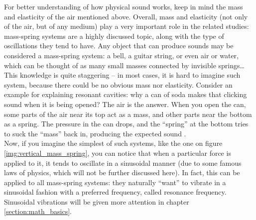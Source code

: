 For better understanding of how physical sound works, keep in mind the mass and elasticity of the air mentioned above. Overall, mass and elasticity (not only of the air, but of any medium) play a very important role in the related studies: mass-spring systems are a highly discussed topic, along with the type of oscillations they tend to have. Any object that can produce sounds may be considered a mass-spring system: a bell, a guitar string, or even air or water, which can be thought of as many small masses connected by invisible springs\dots{} This knowledge is quite staggering -- in most cases, it is hard to imagine such system, because there could be no obvious mass nor elasticity. Consider an example for explaining resonant cavities: why a can of soda makes that clicking sound when it is being opened? The air is the answer. When you open the can, some parts of the air near its top act as a mass, and other parts near the bottom as a spring. The pressure in the can drops, and the “spring” at the bottom tries to suck the “mass” back in, producing the expected sound \cite{Schnupp2011}.\\

Now, if you imagine the simplest of such systems, like the one on figure \ref{img:vertical_mass_spring}, you can notice that when a particular force is applied to it, it tends to oscillate in a sinusoidal manner (due to some famous laws of physics, which will not be further discussed here). In fact, this can be applied to all mass-spring systems: they naturally “want” to vibrate in a sinusoidal fashion with a preferred frequency, called resonance frequency. Sinusoidal vibrations will be given more attention in chapter \ref{section:math_basics}.\\

